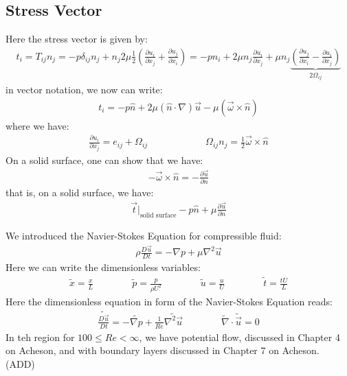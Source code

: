 \documentclass[11pt]{book}
\theoremstyle{break}
\theoremstyle{break}
\newcommand{\pd}{\partial}
\newcommand{\that}[1]{\widetilde{#1}}
\begin{document}
\subsection{Stress Vector}
Here the stress vector is given by:
\begin{align*}
t_i = T_{ij}n_j = -p \delta_{ij}n_j + n_j 2\mu \frac{1}{2}\left( \frac{\pd u_i}{\pd x_j}+\frac{\pd u_j}{\pd x_i}\right) = -p n_i + 2\mu n_j \frac{\pd u_i}{\pd x_j}+ \mu n_j \underbrace{\left( \frac{\pd u_j}{\pd x_i} - \frac{\pd u_i}{\pd x_j}\right) }_{2\Omega_{ij}}
\end{align*}
in vector notation, we now can write:
\begin{align*}
t_i = -p \hat{n} + 2\mu \left( \hat{n}\cdot \nabla\right) \vec{u} - \mu ( \vec{\omega}\times \hat{n})
\end{align*}
where we have:
\begin{align*}
\frac{\pd u_i}{\pd x_j} = e_{ij}+ \Omega_{ij} \qquad \qquad \qquad \Omega_{ij}n_j = \frac{1}{2}\vec{\omega}\times \hat{n}
\end{align*}
On a solid surface, one can show that we have:
\begin{align*}
-\vec{\omega}\times \hat{n} = -\frac{\pd \vec{u}}{\pd n}
\end{align*}
that is, on a solid surface, we have:
\begin{align*}
\vec{t}|_{\text{solid surface}}-p \hat{n}+\mu \frac{\pd \vec{u}}{\pd n}
\end{align*}

\newpage
We introduced the Navier-Stokes Equation for compressible fluid:
\begin{align*}
\rho \frac{D\vec{u}}{Dt} = -\nabla p + \mu \nabla^2 \vec{u}
\end{align*}
Here we can write the dimensionless variables:
\begin{align*}
\that{x} = \frac{x}{L}\qquad\qquad \that{p} = \frac{p}{\rho U^2}\qquad\qquad \that{u} = \frac{u}{U}\qquad\qquad \that{t} = \frac{tU}{L}
\end{align*}
Here the dimensionless equation in form of the Navier-Stokes Equation reads:
\begin{align*}
\that{\frac{D\vec{u}}{Dt}} = -\that{\nabla p} + \frac{1}{Re}\that{\nabla^2 \vec{u}} \qquad\qquad \that{\nabla}\cdot \that{\vec{u}} = 0
\end{align*}
In teh region for $100 \leq Re < \infty$, we have potential flow, discussed in Chapter 4 on Acheson, and with boundary layers discussed in Chapter 7 on Acheson. (ADD)\\
\end{document}
